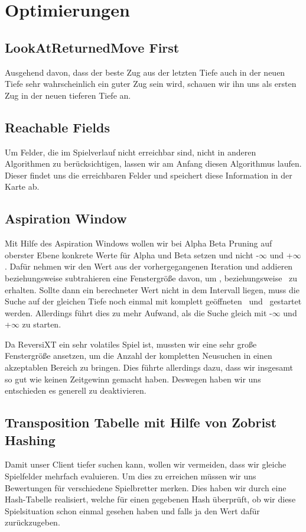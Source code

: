 \documentclass[12pt,a4paper,bibliography=totocnumbered,listof=totocnumbered]{article}
\begin{document}
\section{Optimierungen}
\subsection{LookAtReturnedMove First}
Ausgehend davon, dass der beste Zug aus der letzten Tiefe auch in der neuen Tiefe sehr wahrscheinlich ein guter Zug sein wird, schauen wir ihn uns als ersten Zug in der neuen tieferen Tiefe an.

\subsection{Reachable Fields}
Um Felder, die im Spielverlauf nicht erreichbar sind, nicht in anderen Algorithmen zu berücksichtigen, lassen wir am Anfang diesen Algorithmus laufen. Dieser findet uns die erreichbaren Felder und speichert diese Information in der Karte ab.

\subsection{Aspiration Window}
Mit Hilfe des Aspiration Windows wollen wir bei Alpha Beta Pruning auf oberster Ebene konkrete Werte für Alpha und Beta setzen und nicht  -$\infty$ und +$\infty$ . Dafür nehmen wir den Wert aus der vorhergegangenen Iteration und addieren beziehungsweise subtrahieren eine Fenstergröße davon, um \textalpha, beziehungsweise \textbeta\ zu erhalten. Sollte dann ein berechneter Wert nicht in dem Intervall liegen, muss die Suche auf der gleichen Tiefe noch einmal mit komplett geöffneten \textalpha\ und \textbeta\ gestartet werden. Allerdings führt dies zu mehr Aufwand, als die Suche gleich mit -$\infty$ und +$\infty$ zu starten.

Da ReversiXT ein sehr volatiles Spiel ist, mussten wir eine sehr große Fenstergröße ansetzen, um die Anzahl der kompletten Neusuchen in einen akzeptablen Bereich zu bringen. Dies führte allerdings dazu, dass wir insgesamt so gut wie keinen Zeitgewinn gemacht haben.
Deswegen haben wir uns entschieden es generell zu deaktivieren.

\subsection{Transposition Tabelle mit Hilfe von Zobrist Hashing}
Damit unser Client tiefer suchen kann, wollen wir vermeiden, dass wir gleiche Spielfelder mehrfach evaluieren. Um dies zu erreichen müssen wir uns Bewertungen für verschiedene Spielbretter merken.
Dies haben wir durch eine Hash-Tabelle realisiert, welche für einen gegebenen Hash überprüft, ob wir diese Spielsituation schon einmal gesehen haben und falls ja den Wert dafür zurückzugeben.
\end{document}
